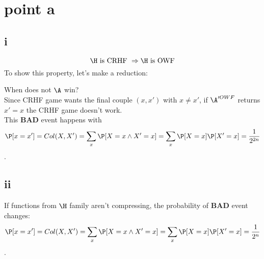 
\section{point a}
\subsection{ i}%

\[
    \H \text{ is CRHF } \Rightarrow \H \text{ is OWF}
\]
To show this property, let's make a reduction:
\begin{figure}[h!]
   \centering
   \sdinit{}
\end{figure}

When does not $\A$ win?\\
Since CRHF game  wants the final couple $(x, x')$ with $x\not= x'$, if
$\A'^{OWF}$ returns $x'=x$ the CRHF game doesn't work.\\

This \textbf{BAD} event happens with 
\[
    \P [ x=x' ]=Col(X, X')=\sum_{x}^{} \P [ X=x \wedge X'=x ]= \sum_{x}^{} \P [X=x] \P [ X'=x ] = \frac{1}{2^{2n}}        
\].
\subsection{ ii}%

If functions from $\H$ family aren't compressing, the probability of
\textbf{BAD} event changes:
\[
    \P [ x=x' ]=Col(X, X')=\sum_{x}^{} \P [ X=x \wedge X'=x ]= \sum_{x}^{} \P [X=x] \P [ X'=x ] = \frac{1}{2^{n}}        
\].

